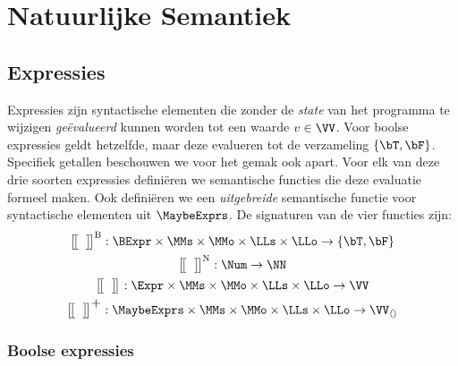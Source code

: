 \chapter{Natuurlijke Semantiek}

\section{Expressies}

Expressies zijn syntactische elementen die zonder de \emph{state} van het programma te wijzigen \emph{geëvalueerd} kunnen worden tot een waarde $v \in \VV$. Voor boolse expressies geldt hetzelfde, maar deze evalueren tot de verzameling $\{\bT, \bF\}$. Specifiek getallen beschouwen we voor het gemak ook apart. Voor elk van deze drie soorten expressies definiëren we semantische functies die deze evaluatie formeel maken. Ook definiëren we een \emph{uitgebreide} semantische functie voor syntactische elementen uit $\MaybeExprs$. De signaturen van de vier functies zijn:
%
\begin{gather*}
  \Express[B]{\;}{} : \BExpr \times \MMs \times \MMo \times \LLs \times \LLo \to \{ \bT, \bF \} \\
  \Express[N]{\;}{} : \Num \to \NN \\
  \Express{\;}{} : \Expr \times \MMs \times \MMo \times \LLs \times \LLo \to \VV \\
  \Express[\scalebox{1.3}{$+$}]{\;}{} : \MaybeExprs \times \MMs \times \MMo \times \LLs \times \LLo \to \VV_{\langle\rangle}
\end{gather*}

\subsection{Boolse expressies}

